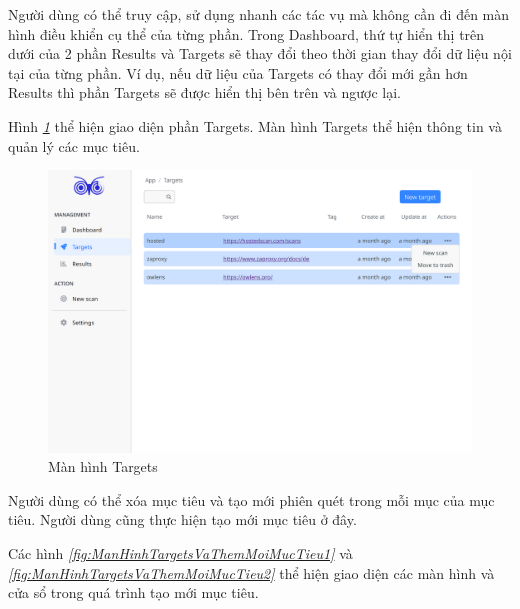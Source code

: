 Người dùng có thể truy cập, sử dụng nhanh các tác vụ mà không cần đi đến màn hình điều khiển cụ thể của từng phần.
Trong Dashboard, thứ tự hiển thị trên dưới của 2 phần Results và Targets sẽ thay đổi theo thời gian thay đổi dữ liệu nội tại của từng phần.
Ví dụ, nếu dữ liệu của Targets có thay đổi mới gần hơn Results thì phần Targets sẽ được hiển thị bên trên và ngược lại.

\tab \tab Hình \textit{\ref{fig:ManHinhTargets} } thể hiện giao diện phần Targets.
Màn hình Targets thể hiện thông tin và quản lý các mục tiêu.

\begin{figure}[H]
      \centering
      \includegraphics[width=\textwidth]{applied-thesis-chapters/chapter-6/Màn hình Targets.png}
      \caption{Màn hình Targets}
      \label{fig:ManHinhTargets}
\end{figure}

Người dùng có thể xóa mục tiêu và tạo mới phiên quét trong mỗi mục của mục tiêu.
Người dùng cũng thực hiện tạo mới mục tiêu ở đây.

Các hình \textit{\ref{fig:ManHinhTargetsVaThemMoiMucTieu1} } 
và \textit{\ref{fig:ManHinhTargetsVaThemMoiMucTieu2} } thể hiện giao diện các màn hình và cửa sổ trong quá trình tạo mới mục tiêu.

